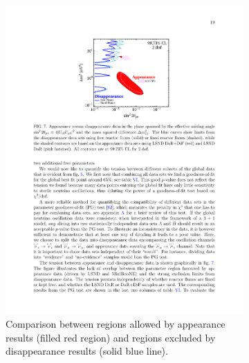 \begin{figure}[htbp]
  \begin{subfigure}{0.48\textwidth}
    \begin{center}
    \includegraphics[width=\linewidth]{figures/disapp.pdf}
    \caption{Comparison between regions allowed by appearance results (filled red region) and regions excluded by disappearance results (solid blue line).}\label{fig:disapp}
    \end{center}
  \end{subfigure}\hfill
  \begin{subfigure}{0.48\textwidth}
    \begin{center}

\end{center}
\end{subfigure}
\end{figure}
